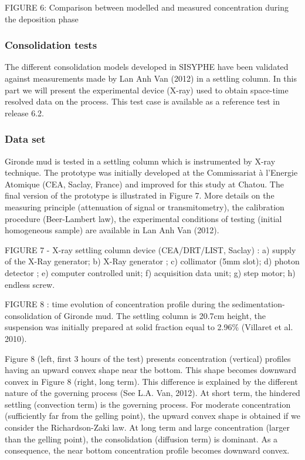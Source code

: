 FIGURE 6:
Comparison between modelled and measured concentration during the deposition
phase

\newpage

\subsubsection{Consolidation tests}

The different consolidation models developed in SISYPHE have been validated
against measurements made by Lan Anh Van (2012) in a settling column. In
this part we will present the experimental device (X-ray) used to obtain
space-time resolved data on the process. This test case is available as a
reference test in release 6.2.

\subsubsection*{Data set}

Gironde mud is tested in a settling column which is instrumented by X-ray
technique. The prototype was initially developed at the Commissariat \`{a}
l'Energie Atomique (CEA, Saclay, France) and improved for this study at
Chatou. The final version of the prototype is illustrated in Figure 7. More
details on the measuring principle (attenuation of signal or
transmitometry), the calibration procedure (Beer-Lambert law), the
experimental conditions of testing (initial homogeneous sample) are
available in Lan Anh Van (2012).

FIGURE 7 - X-ray settling column device (CEA/DRT/LIST, Saclay){\nobreakspace}%
: a) supply of the X-Ray generator{\nobreakspace}; b) X-Ray generator{%
\nobreakspace}; c) collimator (5mm slot){\nobreakspace}; d) photon detector{%
\nobreakspace}; e) computer controlled unit{\nobreakspace}; f) acquisition
data unit{\nobreakspace}; g) step motor{\nobreakspace}; h) endless screw.

FIGURE 8
: time evolution of concentration profile during the
sedimentation-consolidation of Gironde mud. The settling column is 20.7cm
height, the suspension was initially prepared at solid fraction equal to
2.96\% (Villaret et al. 2010).

Figure 8 (left, first 3 hours of the test) presents concentration (vertical)
profiles having an upward convex shape near the bottom. This shape becomes
downward convex in Figure 8 (right, long term). This difference is explained
by the different nature of the governing process (See L.A. Van, 2012). At
short term, the hindered settling (convection term) is the governing
process. For moderate concentration (sufficiently far from the gelling
point), the upward convex shape is obtained if we consider the
Richardson-Zaki law. At long term and large concentration (larger than the
gelling point), the consolidation (diffusion term) is dominant. As a
consequence, the near bottom concentration profile becomes downward convex.%
\newline


